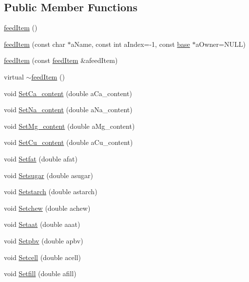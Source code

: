 \subsection*{Public Member Functions}
\begin{DoxyCompactItemize}
\item 
\hyperlink{classfeed_item_a73af127307e66daf2f3e33917b1280fb}{feedItem} ()
\item 
\hyperlink{classfeed_item_a197dc4177d7370a268a3415c6513f8c9}{feedItem} (const char $\ast$aName, const int aIndex=-\/1, const \hyperlink{classbase}{base} $\ast$aOwner=NULL)
\item 
\hyperlink{classfeed_item_a0580da5b8464e7ff2e0c5f3dfb7d283f}{feedItem} (const \hyperlink{classfeed_item}{feedItem} \&afeedItem)
\item 
virtual \hyperlink{classfeed_item_af5ca79138cd28d4b7680dbb5a7364485}{$\sim$feedItem} ()
\item 
void \hyperlink{classfeed_item_a2d486d396496328acb2e582f893ec4de}{SetCa\_\-content} (double aCa\_\-content)
\item 
void \hyperlink{classfeed_item_af185439c6c0da32fc712bf9a35fda6c9}{SetNa\_\-content} (double aNa\_\-content)
\item 
void \hyperlink{classfeed_item_a95db87077d1b12a093660122ce24fabc}{SetMg\_\-content} (double aMg\_\-content)
\item 
void \hyperlink{classfeed_item_a7c18d24c378e42878f02a9176d50d602}{SetCu\_\-content} (double aCu\_\-content)
\item 
void \hyperlink{classfeed_item_a07bd81603f69ad7327240ed4cbe8d5dd}{Setfat} (double afat)
\item 
void \hyperlink{classfeed_item_a4a4100a9156246db8cfc71f3afb53ead}{Setsugar} (double asugar)
\item 
void \hyperlink{classfeed_item_aa8bab3d84660829128f91b2ae3dd0b80}{Setstarch} (double astarch)
\item 
void \hyperlink{classfeed_item_a4e2a499cdafc37014f23df3f07dcad23}{Setchew} (double achew)
\item 
void \hyperlink{classfeed_item_a5383fd234b023fc02524e43f6120b7f1}{Setaat} (double aaat)
\item 
void \hyperlink{classfeed_item_a8bec4685c5f70384fc3801c6c77dfc5a}{Setpbv} (double apbv)
\item 
void \hyperlink{classfeed_item_abbdbf6ffa1e77cd9fb8b4ba313caae2c}{Setcell} (double acell)
\item 
void \hyperlink{classfeed_item_a8ccb6b7516b1700a77e743ea15d778be}{Setfill} (double afill)

\end{DoxyCompactItemize}
